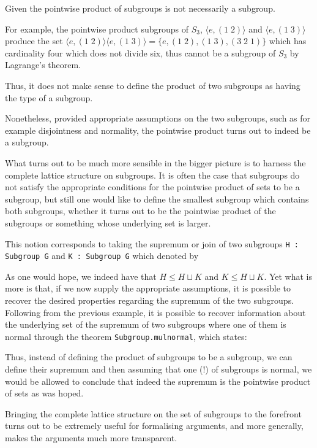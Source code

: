 \begin{remark}
    Given the pointwise product of subgroups is not necessarily a subgroup. 

    For example, the pointwise product subgroups of $S_3$, $\langle e, (1\;2) \rangle$ and $\langle e, (1\;3) \rangle$ produce the set 
    $\langle e, (1\;2) \rangle \langle e, (1\;3) \rangle =\{e, (1\;2), (1\;3), (3\;2\;1)\}$ which has cardinality four which does not divide six,
    thus cannot be a subgroup of $S_3$ by Lagrange's theorem.

    Thus, it does not make sense to define the product of two subgroups as having the type of a subgroup.

    Nonetheless, provided appropriate assumptions on the two subgroups, such as for example disjointness and normality, the pointwise product turns out to indeed be a subgroup.
    
    What turns out to be much more sensible in the bigger picture is to harness the complete lattice structure on subgroups. It is often the case that
    subgroups do not satisfy the appropriate conditions for the pointwise product of sets to be a subgroup, but still one would like to define the smallest subgroup which contains both subgroups,
    whether it turns out to be the pointwise product of the subgroups or something whose underlying set is larger.

    This notion corresponds to taking the supremum or join of two subgroups \texttt{H : Subgroup G} and \texttt{K : Subgroup G} which denoted by 


    As one would hope, we indeed have that $H \le H \sqcup K$ and $K \le H \sqcup K$.
    Yet what is more is that, if we now supply the appropriate assumptions, it is
    possible to recover the desired properties regarding the supremum of the two subgroups. Following from the previous example,
    it is possible to recover information about the underlying set of the supremum of two subgroups where one of them is normal 
    through the theorem \texttt{Subgroup.mul\textunderscore normal}, which states:
 
    
    Thus, instead of defining the product of subgroups to be a subgroup, we can define their supremum and then
    assuming that one (!) of subgroups is normal, we would be allowed to conclude that indeed the supremum
    is the pointwise product of sets as was hoped.
    
    Bringing the complete lattice structure on the set of subgroups to the forefront turns out to be extremely useful for formalising arguments,
    and more generally, makes the arguments much more transparent.
\end{remark}

